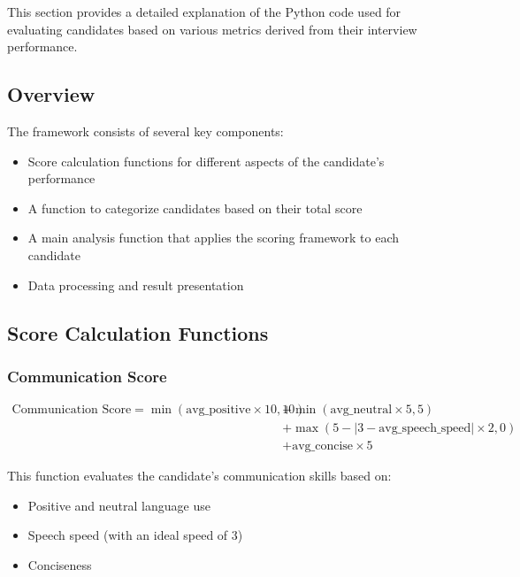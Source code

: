 \documentclass{article}
\begin{document}
This section provides a detailed explanation of the Python code used for evaluating candidates based on various metrics derived from their interview performance.

\subsection{Overview}

The framework consists of several key components:

\begin{itemize}
    \item Score calculation functions for different aspects of the candidate's performance
    \item A function to categorize candidates based on their total score
    \item A main analysis function that applies the scoring framework to each candidate
    \item Data processing and result presentation
\end{itemize}

\subsection{Score Calculation Functions}

\subsubsection{Communication Score}

\small
\begin{equation}
    \begin{aligned}
        \text{Communication Score} = \min(\text{avg\_positive} \times 10, 10)
        &+ \min(\text{avg\_neutral} \times 5, 5) \\
        &+ \max(5 - |3 - \text{avg\_speech\_speed}| \times 2, 0) \\
        &+ \text{avg\_concise} \times 5
    \end{aligned}
\end{equation}
\normalsize





This function evaluates the candidate's communication skills based on:
\begin{itemize}
    \item Positive and neutral language use
    \item Speech speed (with an ideal speed of 3)
    \item Conciseness
\end{itemize}
\end{document}
